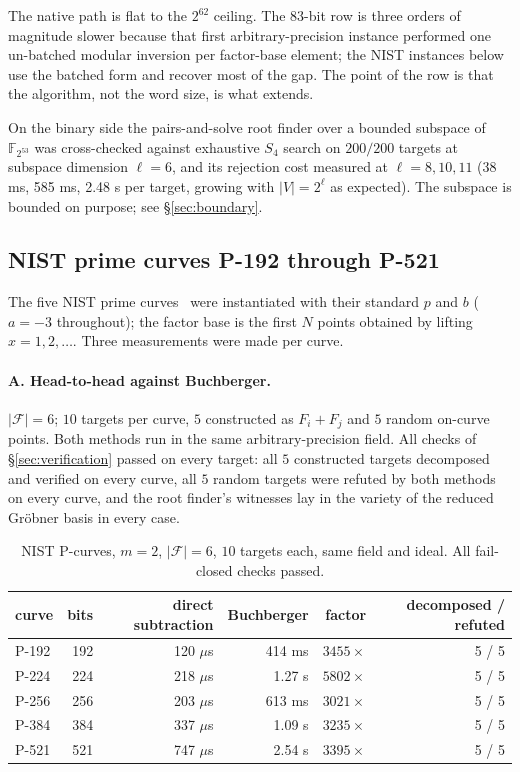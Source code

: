 \documentclass[10pt,a4paper]{article}
\theoremstyle{remark}
\newcommand{\FF}{\mathbb{F}}
\newcommand{\Fb}{\mathcal{F}}
\newcommand{\Sem}[1]{S_{#1}}
\newcommand{\abs}[1]{\lvert #1 \rvert}
\begin{document}
The native path is flat to the $2^{62}$ ceiling. The $83$-bit row is
three orders of magnitude slower because that first arbitrary-precision
instance performed one un-batched modular inversion per factor-base
element; the NIST instances below use the batched form and recover most
of the gap. The point of the row is that the algorithm, not the word
size, is what extends.

On the binary side the pairs-and-solve root finder over a bounded
subspace of $\FF_{2^{53}}$ was cross-checked against exhaustive $\Sem{4}$
search on $200/200$ targets at subspace dimension $\ell = 6$, and its
rejection cost measured at $\ell = 8, 10, 11$ (38 ms, 585 ms, 2.48 s per
target, growing with $\abs{V} = 2^\ell$ as expected). The subspace is
bounded on purpose; see \S\ref{sec:boundary}.

\subsection{NIST prime curves P-192 through P-521}
\label{sec:exp-nist}

The five NIST prime curves~\cite{fips186-4} were instantiated with their
standard $p$ and $b$ ($a = -3$ throughout); the factor base is the first
$N$ points obtained by lifting $x = 1, 2, \ldots$. Three measurements
were made per curve.

\paragraph{A. Head-to-head against Buchberger.} $\abs{\Fb} = 6$; $10$
targets per curve, $5$ constructed as $F_i + F_j$ and $5$ random
on-curve points. Both methods run in the same arbitrary-precision field.
All checks of \S\ref{sec:verification} passed on every target: all $5$
constructed targets decomposed and verified on every curve, all $5$
random targets were refuted by both methods on every curve, and the
root finder's witnesses lay in the variety of the reduced Gr\"obner
basis in every case.

\begin{table}[h]
\centering
\caption{NIST P-curves, $m=2$, $\abs{\Fb}=6$, $10$ targets each, same
field and ideal. All fail-closed checks passed.}
\label{tab:nist-f4}
\begin{tabular}{@{}lrrrrr@{}}
\toprule
curve & bits & direct subtraction & Buchberger & factor & decomposed / refuted \\
\midrule
P-192 & 192 & 120 $\mu$s & 414 ms & $3455\times$ & 5 / 5 \\
P-224 & 224 & 218 $\mu$s & 1.27 s & $5802\times$ & 5 / 5 \\
P-256 & 256 & 203 $\mu$s & 613 ms & $3021\times$ & 5 / 5 \\
P-384 & 384 & 337 $\mu$s & 1.09 s & $3235\times$ & 5 / 5 \\
P-521 & 521 & 747 $\mu$s & 2.54 s & $3395\times$ & 5 / 5 \\
\bottomrule
\end{tabular}
\end{table}
\end{document}
